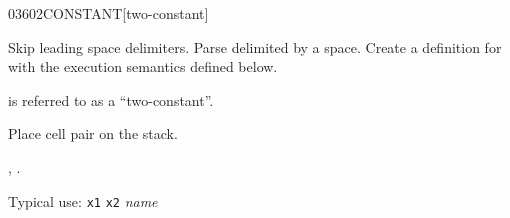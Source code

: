 \begin{worddef}{0360}{2CONSTANT}[two-constant]
\item {}

	Skip leading space delimiters. Parse  delimited by
	a space. Create a definition for  with the execution
	semantics defined below.

	 is referred to as a ``two-constant''.

\execute[name]

	Place cell pair  on the stack.

\see {},
	.


	\begin{rationale} %
		Typical use:
			\texttt{x1} \texttt{x2}  \emph{name}
	\end{rationale}

	\begin{testing}
		 \\

		 \\

		 \\
		 \\

		 \\
	\end{testing}
\end{worddef}

